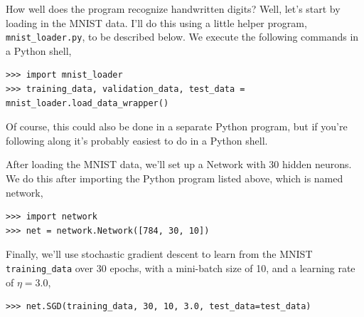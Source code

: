 \documentclass[a4paper,twoside,10pt]{book}
\begin{document}
How well does the program recognize handwritten digits? Well, let's start by loading in the MNIST data. I'll do this using a little helper program, \texttt{mnist\_loader.py}, to be described below. We execute the following commands in a Python shell,
\begin{lstlisting}
>>> import mnist_loader
>>> training_data, validation_data, test_data = mnist_loader.load_data_wrapper()
\end{lstlisting}
Of course, this could also be done in a separate Python program, but if you're following along it's probably easiest to do in a Python shell.

After loading the MNIST data, we'll set up a Network with 30 hidden neurons. We do this after importing the Python program listed above, which is named network,

%
\begin{lstlisting}
>>> import network
>>> net = network.Network([784, 30, 10])
\end{lstlisting}

Finally, we'll use stochastic gradient descent to learn from the MNIST \texttt{training\_data} over 30 epochs, with a mini-batch size of 10, and a learning rate of $\eta=3.0$,

\begin{lstlisting}
>>> net.SGD(training_data, 30, 10, 3.0, test_data=test_data)
\end{lstlisting}
\end{document}
